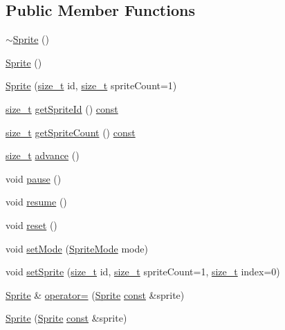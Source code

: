 \subsection*{Public Member Functions}
\begin{DoxyCompactItemize}
\item 
\hyperlink{classarcade_1_1_sprite_a8e523ec675ab75663ba3fc33743aeb72}{$\sim$\-Sprite} ()
\item 
\hyperlink{classarcade_1_1_sprite_a0f5d8c683d816e28c44e87206fc563a7}{Sprite} ()
\item 
\hyperlink{classarcade_1_1_sprite_a55316e015ec39ce95a06b3f913de48be}{Sprite} (\hyperlink{nc__alloc_8h_a7b60c5629e55e8ec87a4547dd4abced4}{size\-\_\-t} id, \hyperlink{nc__alloc_8h_a7b60c5629e55e8ec87a4547dd4abced4}{size\-\_\-t} sprite\-Count=1)
\item 
\hyperlink{nc__alloc_8h_a7b60c5629e55e8ec87a4547dd4abced4}{size\-\_\-t} \hyperlink{classarcade_1_1_sprite_a81260d4187d58695ee767fbf786223ab}{get\-Sprite\-Id} () \hyperlink{term__entry_8h_a57bd63ce7f9a353488880e3de6692d5a}{const} 
\item 
\hyperlink{nc__alloc_8h_a7b60c5629e55e8ec87a4547dd4abced4}{size\-\_\-t} \hyperlink{classarcade_1_1_sprite_a9abd7394e6f785e8a12c40ba2b9efeea}{get\-Sprite\-Count} () \hyperlink{term__entry_8h_a57bd63ce7f9a353488880e3de6692d5a}{const} 
\item 
\hyperlink{nc__alloc_8h_a7b60c5629e55e8ec87a4547dd4abced4}{size\-\_\-t} \hyperlink{classarcade_1_1_sprite_ac2139891db91b8f5c48523d45192fe67}{advance} ()
\item 
void \hyperlink{classarcade_1_1_sprite_aeb763f7ab0781642a9cd9962c8824931}{pause} ()
\item 
void \hyperlink{classarcade_1_1_sprite_a0b50dbe2b0168198aa2761e49c7e1a4a}{resume} ()
\item 
void \hyperlink{classarcade_1_1_sprite_aa769e445c43384adf06c73d4f60d0f55}{reset} ()
\item 
void \hyperlink{classarcade_1_1_sprite_ae21b3b72968d9628c161473e952dfff0}{set\-Mode} (\hyperlink{classarcade_1_1_sprite_a897686598b8b81a1c7b329b5621f8146}{Sprite\-Mode} mode)
\item 
void \hyperlink{classarcade_1_1_sprite_af1727bb5688fab424bae0cb03f5a7543}{set\-Sprite} (\hyperlink{nc__alloc_8h_a7b60c5629e55e8ec87a4547dd4abced4}{size\-\_\-t} id, \hyperlink{nc__alloc_8h_a7b60c5629e55e8ec87a4547dd4abced4}{size\-\_\-t} sprite\-Count=1, \hyperlink{nc__alloc_8h_a7b60c5629e55e8ec87a4547dd4abced4}{size\-\_\-t} index=0)
\item 
\hyperlink{classarcade_1_1_sprite}{Sprite} \& \hyperlink{classarcade_1_1_sprite_a06ce55b9dcbb25952f3a267c82e37a2b}{operator=} (\hyperlink{classarcade_1_1_sprite}{Sprite} \hyperlink{term__entry_8h_a57bd63ce7f9a353488880e3de6692d5a}{const} \&sprite)
\item 
\hyperlink{classarcade_1_1_sprite_ae7194e727354e7b6fd208e0cb72887b4}{Sprite} (\hyperlink{classarcade_1_1_sprite}{Sprite} \hyperlink{term__entry_8h_a57bd63ce7f9a353488880e3de6692d5a}{const} \&sprite)
\end{DoxyCompactItemize}


